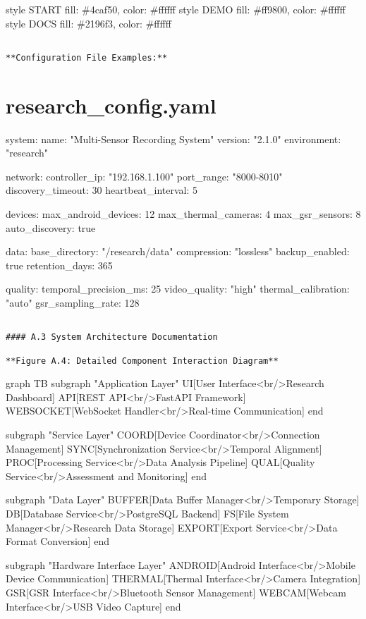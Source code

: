 \documentclass[12pt,a4paper]{report}
\begin{document}
style START fill: \#4caf50, color: \#ffffff
style DEMO fill: \#ff9800, color: \#ffffff
style DOCS fill: \#2196f3, color: \#ffffff
\begin{verbatim}

**Configuration File Examples:**

\end{verbatim}
\section{research_config.yaml}
system:
  name: "Multi-Sensor Recording System"
  version: "2.1.0"
  environment: "research"

network:
  controller\_ip: "192.168.1.100"
  port\_range: "8000-8010"
  discovery\_timeout: 30
  heartbeat\_interval: 5

devices:
  max\_android\_devices: 12
  max\_thermal\_cameras: 4
  max\_gsr\_sensors: 8
  auto\_discovery: true

data:
  base\_directory: "/research/data"
  compression: "lossless"
  backup\_enabled: true
  retention\_days: 365

quality:
  temporal\_precision\_ms: 25
  video\_quality: "high"
  thermal\_calibration: "auto"
  gsr\_sampling\_rate: 128
\begin{verbatim}

#### A.3 System Architecture Documentation

**Figure A.4: Detailed Component Interaction Diagram**

\end{verbatim}
graph TB
    subgraph "Application Layer"
        UI[User Interface<br/>Research Dashboard]
        API[REST API<br/>FastAPI Framework]
        WEBSOCKET[WebSocket Handler<br/>Real-time Communication]
    end

    subgraph "Service Layer"
        COORD[Device Coordinator<br/>Connection Management]
        SYNC[Synchronization Service<br/>Temporal Alignment]
        PROC[Processing Service<br/>Data Analysis Pipeline]
        QUAL[Quality Service<br/>Assessment and Monitoring]
    end

    subgraph "Data Layer"
        BUFFER[Data Buffer Manager<br/>Temporary Storage]
        DB[Database Service<br/>PostgreSQL Backend]
        FS[File System Manager<br/>Research Data Storage]
        EXPORT[Export Service<br/>Data Format Conversion]
    end

    subgraph "Hardware Interface Layer"
        ANDROID[Android Interface<br/>Mobile Device Communication]
        THERMAL[Thermal Interface<br/>Camera Integration]
        GSR[GSR Interface<br/>Bluetooth Sensor Management]
        WEBCAM[Webcam Interface<br/>USB Video Capture]
    end
\end{document}
